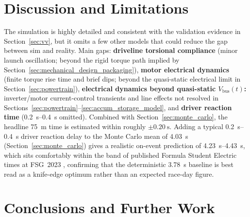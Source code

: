 \documentclass[11pt, a4paper]{report}
\numberwithin{equation}{section}
\begin{document}
\begin{refsection}
\section{Discussion and Limitations}
\label{sec:discussion}

The simulation is highly detailed and
consistent with the validation evidence in Section~\ref{sec:vv}, but it
omits a few other models that could reduce the gap between sim and reality. Main gaps:
\textbf{driveline torsional compliance} (minor launch oscillation; beyond the rigid torque path implied by Section~\ref{sec:mechanical_design_packaging}),
\textbf{motor electrical dynamics} (finite torque rise time and brief dips; beyond the quasi-static electrical limit in Section~\ref{sec:powertrain}),
\textbf{electrical dynamics beyond quasi-static $V_{\mathrm{bus}}(t)$:} inverter/motor current-control transients and line effects not resolved in Sections~\ref{sec:powertrain}--\ref{sec:accum_storage_model}, and \textbf{driver reaction time}
(\SIrange{0.2}{0.4}{\second} omitted). Combined with
Section~\ref{sec:monte_carlo}, the headline \SI{75}{\metre} time is
estimated within roughly $\pm \SI{0.20}{\second}$. Adding a typical
\SIrange{0.2}{0.4}{\second} driver reaction delay to the Monte Carlo
mean of \SI{4.03}{\second} (Section~\ref{sec:monte_carlo}) gives a
realistic on-event prediction of
\SIrange{4.23}{4.43}{\second}, which sits comfortably within the band
of published Formula Student Electric times at FSG~2023
\cite{fsg_results_2023}, confirming that the deterministic
\SI{3.78}{\second} baseline is best read as a knife-edge optimum
rather than an expected race-day figure.

\section{Conclusions and Further Work}
\label{sec:conclusions}


\end{refsection}
\end{document}
